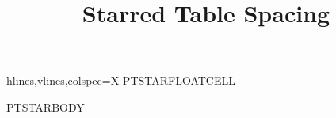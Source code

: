\documentclass[nominted]{pt-article}
\title{Starred Table Spacing}
\begin{document}
\begin{table}[t]
    \centering
    \begin{tblr}{hlines,vlines,colspec={X}}
        PTSTARFLOATCELL
    \end{tblr}
    \caption{PTSTARFLOATCAPTION}
\end{table}

\noindent PTSTARBODY
\clearpage
\end{document}
